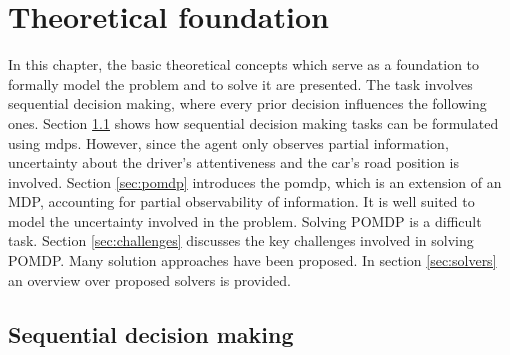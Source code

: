 \chapter{Theoretical foundation}
\label{ch:theory}


In this chapter, the basic theoretical concepts which serve as a foundation to formally model the problem and to solve it are presented. The task involves sequential decision making, where every prior decision influences the following ones. Section \ref{sec:mdp} shows how sequential decision making tasks can be formulated using \Glspl{mdp}. However, since the agent only observes partial information, uncertainty about the driver's attentiveness and the car's road position is involved. Section \ref{sec:pomdp} introduces the \Gls{pomdp}, which is an extension of an MDP, accounting for partial observability of information. It is well suited to model the uncertainty involved in the problem. Solving POMDP is a difficult task. Section \ref{sec:challenges} discusses the key challenges involved in solving POMDP. Many solution approaches have been proposed. In section \ref{sec:solvers} an overview over proposed solvers is provided.

\section{Sequential decision making}
\label{sec:mdp}

